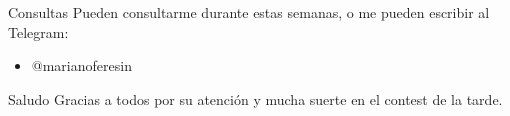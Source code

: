 \documentclass{beamer}
\begin{document}
\begin{frame}{Consultas}
	Pueden consultarme durante estas semanas, o me pueden escribir al Telegram:
	\begin{itemize}
		\item @marianoferesin
	\end{itemize}
\end{frame}

\begin{frame}{Saludo}
	\centering
	Gracias a todos por su atención y mucha suerte en el contest de la tarde.
\end{frame}
\end{document}
